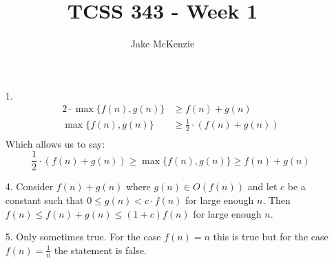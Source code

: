 \documentclass[12pt]{article}
\begin{document}
\title{TCSS 343 - Week 1}
\author{Jake McKenzie}
\maketitle
\begin{enumerate}
    \item[1.]
    \begin{align*}
        2 \cdot \max\{f(n),g(n)\} &\geq f(n) + g(n)\\
        \max\{f(n),g(n)\} &\geq \frac{1}{2} \cdot (f(n) + g(n))\\
    \end{align*}
    Which allows us to say:
    $$\frac{1}{2} \cdot (f(n) + g(n)) \geq \max\{f(n),g(n)\} \geq  f(n) + g(n)$$
    \item[4.]
    Consider $f(n) + g(n)$ where $g(n) \in O(f(n))$ and let $c$ be a constant such that $0 \leq g(n) < c \cdot f(n)$ for large enough $n$. Then $f(n) \leq f(n)+g(n) \leq (1 + c)f(n)$ for large enough $n$.
    \item[5.]
    Only sometimes true. For the case $f(n) = n$ this is true but for the case $f(n) = \frac{1}{n}$ the statement is false.
\end{enumerate}
\end{document}
